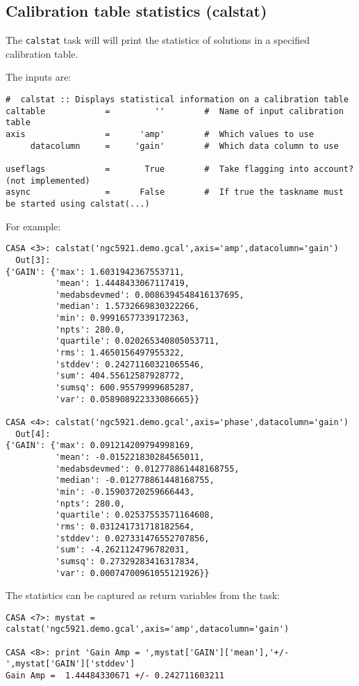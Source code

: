 \subsection{Calibration table statistics ({\rm calstat})}
\label{section:cal.tables.calstat}

The {\tt calstat} task will will print the statistics of solutions in a specified 
calibration table.

The inputs are:
\small
\begin{verbatim}
#  calstat :: Displays statistical information on a calibration table
caltable            =         ''        #  Name of input calibration table
axis                =      'amp'        #  Which values to use
     datacolumn     =     'gain'        #  Which data column to use

useflags            =       True        #  Take flagging into account? (not implemented)
async               =      False        #  If true the taskname must be started using calstat(...)
\end{verbatim}
\normalsize

For example:
\small
\begin{verbatim}
CASA <3>: calstat('ngc5921.demo.gcal',axis='amp',datacolumn='gain')
  Out[3]: 
{'GAIN': {'max': 1.6031942367553711,
          'mean': 1.4448433067117419,
          'medabsdevmed': 0.0086394548416137695,
          'median': 1.5732669830322266,
          'min': 0.99916577339172363,
          'npts': 280.0,
          'quartile': 0.020265340805053711,
          'rms': 1.4650156497955322,
          'stddev': 0.24271160321065546,
          'sum': 404.55612587928772,
          'sumsq': 600.95579999685287,
          'var': 0.058908922333086665}}

CASA <4>: calstat('ngc5921.demo.gcal',axis='phase',datacolumn='gain')
  Out[4]: 
{'GAIN': {'max': 0.091214209794998169,
          'mean': -0.015221830284565011,
          'medabsdevmed': 0.012778861448168755,
          'median': -0.012778861448168755,
          'min': -0.15903720259666443,
          'npts': 280.0,
          'quartile': 0.02537553571164608,
          'rms': 0.031241731718182564,
          'stddev': 0.027331476552707856,
          'sum': -4.2621124796782031,
          'sumsq': 0.27329283416317834,
          'var': 0.00074700961055121926}}
\end{verbatim}
\normalsize
The statistics can be captured as return variables from the task:
\small
\begin{verbatim}
CASA <7>: mystat = calstat('ngc5921.demo.gcal',axis='amp',datacolumn='gain')

CASA <8>: print 'Gain Amp = ',mystat['GAIN']['mean'],'+/-',mystat['GAIN']['stddev']
Gain Amp =  1.44484330671 +/- 0.242711603211
\end{verbatim}
\normalsize

